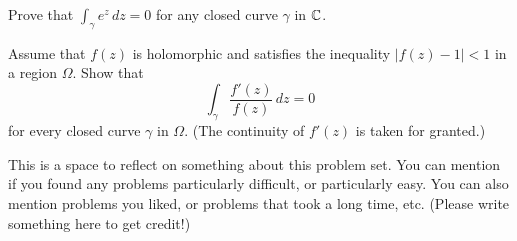 \begin{problem}
  Prove that $\int_\gamma e^z\,dz=0$ for any closed curve $\gamma$ in $\mathbb{C}$.
\end{problem}

\begin{problem}
  Assume that $f(z)$ is holomorphic and satisfies the inequality $|f(z)-1|<1$ in a region $\Omega$. Show that
  \[\int_{\gamma}\frac{f'(z)}{f(z)}\,dz=0\]
  for every closed curve $\gamma$ in $\Omega$. (The continuity of $f'(z)$ is taken for granted.)
\end{problem}

\begin{problem}
  This is a space to reflect on something about this problem set. You can mention if you found any problems particularly difficult, or particularly easy. You can also mention problems you liked, or problems that took a long time, etc. (Please write something here to get credit!)
\end{problem}
